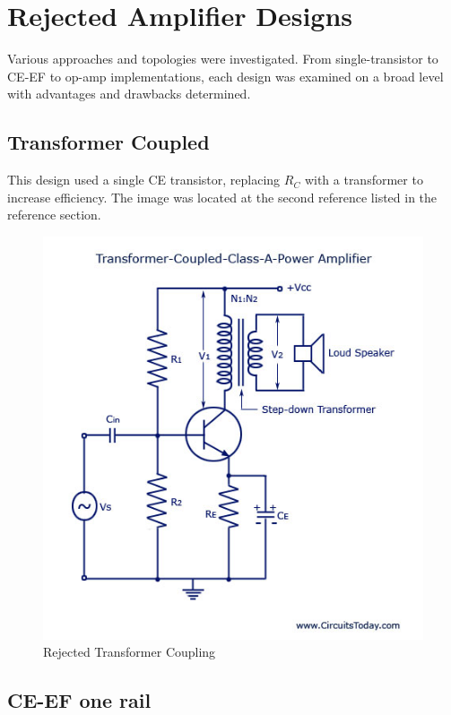 \documentclass[journal]{IEEEtran}
\begin{document}
\section{Rejected Amplifier Designs}

Various approaches and topologies were investigated. From single-transistor to CE-EF to op-amp implementations, each design was examined on a broad level with advantages and drawbacks determined.

\subsection{Transformer Coupled}

This design used a single CE transistor, replacing $R_{C}$ with a transformer to increase efficiency.
The image was located at the second reference listed in the reference section.

\begin{figure}[H]
\centering
\includegraphics[scale=.4]{reject-1.jpg}
\caption{Rejected Transformer Coupling}
\label{fig_reject_1}
\end{figure}


\subsection{CE-EF one rail}
\end{document}
